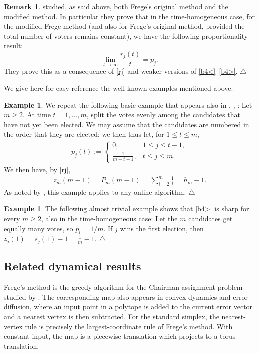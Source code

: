 \documentclass[11pt,reqno,tbtags,a4paper]{amsart}
\numberwithin{equation}{section}
\renewcommand\le{\leq}
\renewcommand\ge{\geq}
\renewcommand\leq{\leqslant}
\renewcommand\geq{\geqslant}
\theoremstyle{plain}%
\theoremstyle{definition}
\newcommand\xqed[1]{%
    \leavevmode\unskip\penalty9999 \hbox{}\nobreak\hfill
    \quad\hbox{#1}}
\newtheorem{exampleqqq}[theorem]{Example}
\newenvironment{example}{\begin{exampleqqq}}
  {\xqed{$\triangle$}\end{exampleqqq}}
\newtheorem{remarkqqq}[theorem]{Remark}
\newenvironment{remark}{\begin{remarkqqq}}
  {\xqed{$\triangle$}\end{remarkqqq}}
\theoremstyle{remark}
\newcounter{cases}
\newcommand\0{{\boldsymbol 0}}
\newcommand\1{{\boldsymbol 1}}
\begin{document}
\begin{remark}
\citet{HLL} studied, as said above, both
Frege's original method and the modified method.
In particular they prove  \cite[Theorem 2]{HLL} that
in the time-homogeneous case,
for the modified Frege method 
(and also for Frege's original method, provided the total number of voters
remains constant),
we have the following proportionality result:
\begin{equation}\label{prop}
\lim_{t\to \infty} \frac{r_j(t)}{t}= p_j.
\end{equation}
They prove this as a consequence of \eqref{rj} and weaker versions of
\eqref{b4<}--\eqref{b4>}. 
\end{remark}

We give here for easy reference the well-known examples mentioned above.
\begin{example}\label{E1}
We repeat the following basic example that appears also in
\cite{Tijdeman80}, \cite{Coppersmith}, \cite{HLL}:
Let $m\ge2$.
At time $t=1,\dots,m$, split the votes evenly among the candidates that
have not yet been elected.
We may assume that the candidates are numbered in the order that they are
elected; we then thus let, for $1\le t\le m$,
\begin{align}
  p_j(t):=
  \begin{cases}
0, & 1\le j \le t-1,    
\\
\frac{1}{m-t+1}, & t\le j \le m
.  \end{cases}
\end{align}
We then have, by \eqref{rj},
\begin{align}
z_m(m-1)=
  P_m(m-1)=\sum_{i=2}^m\frac{1}i
=h_m-1.
\end{align}
As noted by \citet{Tijdeman80}, this example applies to any online algorithm.
\end{example}

\begin{example}\label{E2}
 The following almost trivial example \cite{Coppersmith} %
shows that \eqref{b4>} is sharp for every $m\ge2$, also in
the time-homogeneous case:
Let the $m$ candidates get equally many votes, so $p_i=1/m$.
If
$j$ wins the first election, then %
$z_j(1)=s_j(1)-1=\frac{1}{m}-1$.
\end{example}

\subsection{Related dynamical results}\label{SSAdler}
Frege's method is the greedy algorithm for the Chairman assignment problem
studied by \citet{Coppersmith}. The corresponding map also appears in
convex dynamics and error diffusion, where an input point in a polytope is added
to the current error vector and a nearest vertex is then subtracted.
For the standard simplex, the nearest-vertex rule is precisely the
largest-coordinate rule of Frege's method. With constant input, the map
is a piecewise translation which projects to a torus translation.
\end{document}
